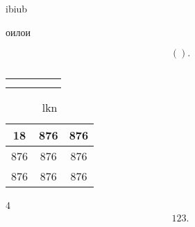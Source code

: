 \documentclass[a4paper]{article}
\title{}
\begin{document}
	\maketitle
\begin{thm}
ibiub
\end{thm}
\begin{prob}
оилои
\end{prob}
\begin{prop}

\end{prop}
\[
	( )
.\] 
\begin{table}[htpb]
\centering
\caption{    }
\label{tab:}
\begin{tabular}{|c|c|c|c|c|}
	\hline  &  &  &  &  \\
	\hline  &  &  &  &  \\
	\hline  &  &  &  &  \\
	\hline
\end{tabular}
\end{table}
\begin{prob}
\end{prob}

\begin{table}[htpb]
\centering
\caption{lkn}
\label{tab:2}
\begin{tabular}{|c|c|c|}
	\hline 18 & 876 & 876 \\
	\hline 876 & 876 & 876 \\
	\hline 876 & 876 & 876 \\
	\hline
\end{tabular}
\end{table}
4
\begin{multline*}
123
.\end{multline*}  
\end{document}
